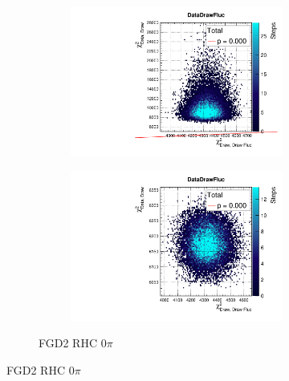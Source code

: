 \begin{figure}[h]
\begin{subfigure}[t]{\textwidth}
\begin{subfigure}[t]{0.24\textwidth}
			\includegraphics[width=\textwidth, trim={0mm 0mm 0mm 8mm}, clip,page=146]{figures/mach3/2018/data/2018a_FixedCov_RedCov_Mpi_Data_merge_PriorPred_procs}
		\end{subfigure}
		\begin{subfigure}[t]{0.24\textwidth}
			\includegraphics[width=\textwidth, trim={0mm 0mm 0mm 8mm}, clip,page=146]{figures/mach3/2018/data/2018a_FixedCov_RedCov_Mpi_Data_merge_PostPredStore_FullLLH_procs}
		\end{subfigure}
		\caption{FGD2 \numu RHC 0$\pi$}
	\end{subfigure}
	

\end{figure}
